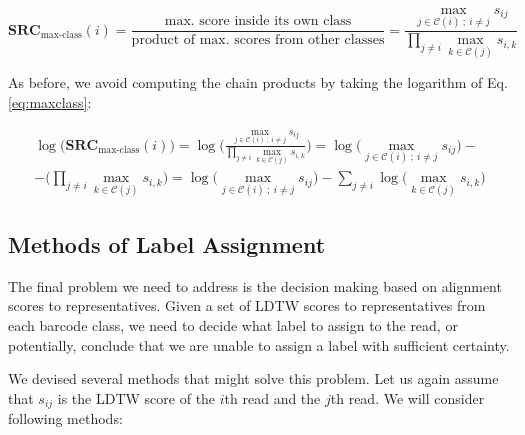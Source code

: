 \begin{equation}
    \textbf{SRC}_{\text{max-class}}(i) =
        \frac{\text{max. score inside its own class} }{\text{product of max. scores from other classes} } =
    \frac{
        \max_{j \in \mathcal{C}(i) ~;~ i \neq j} s_{ij}
    }{
        \prod_{j \neq i} \max_{k \in \mathcal{C}(j)} s_{i, k}
    }
    \label{eq:maxclass}
\end{equation}

As before, we avoid computing the chain products by taking the logarithm of Eq. \ref{eq:maxclass}:

\begin{multline}
    \log \Big( \textbf{SRC}_{\text{max-class}}(i) \Big) = \log \Bigg( \frac{
        \max_{j \in \mathcal{C}(i) ~;~ i \neq j} s_{ij}
    }{
        \prod_{j \neq i} \max_{k \in \mathcal{C}(j)} s_{i, k}
    } \Bigg) = \log \Big(
        \max_{j \in \mathcal{C}(i) ~;~ i \neq j} s_{ij}
    \Big) - \\ - \Bigg(
        \prod_{j \neq i} \max_{k \in \mathcal{C}(j)} s_{i, k}
    \Bigg) = \log \Big(
        \max_{j \in \mathcal{C}(i) ~;~ i \neq j} s_{ij}  \Big) -         \sum_{j \neq i} \log \Big( \max_{k \in \mathcal{C}(j)} s_{i, k} \Big)
\end{multline}

\subsection{Methods of Label Assignment}
The final problem we need to address is the decision making based on alignment scores to representatives. Given a set of LDTW scores to representatives from each barcode class, we need to decide what label to assign to the read, or potentially, conclude that we are unable to assign a label with sufficient certainty.

We devised several methods that might solve this problem. Let us again assume that $s_{ij}$ is the LDTW score of the $i$th read and the $j$th read. We will consider following methods:

